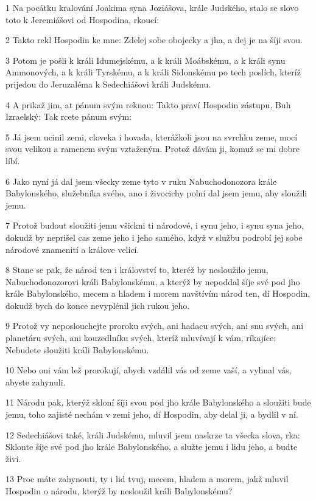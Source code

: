 \par 1 Na pocátku kralování Joakima syna Joziášova, krále Judského, stalo se slovo toto k Jeremiášovi od Hospodina, rkoucí:
\par 2 Takto rekl Hospodin ke mne: Zdelej sobe obojecky a jha, a dej je na šíji svou.
\par 3 Potom je pošli k králi Idumejskému, a k králi Moábskému, a k králi synu Ammonových, a k králi Tyrskému, a k králi Sidonskému po tech poslích, kteríž prijedou do Jeruzaléma k Sedechiášovi králi Judskému.
\par 4 A prikaž jim, at pánum svým reknou: Takto praví Hospodin zástupu, Buh Izraelský: Tak rcete pánum svým:
\par 5 Já jsem ucinil zemi, cloveka i hovada, kterážkoli jsou na svrchku zeme, mocí svou velikou a ramenem svým vztaženým. Protož dávám ji, komuž se mi dobre líbí.
\par 6 Jako nyní já dal jsem všecky zeme tyto v ruku Nabuchodonozora krále Babylonského, služebníka svého, ano i živocichy polní dal jsem jemu, aby sloužili jemu.
\par 7 Protož budout sloužiti jemu všickni ti národové, i synu jeho, i synu syna jeho, dokudž by neprišel cas zeme jeho i jeho samého, když v službu podrobí jej sobe národové znamenití a králove velicí.
\par 8 Stane se pak, že národ ten i království to, kteréž by nesloužilo jemu, Nabuchodonozorovi králi Babylonskému, a kterýž by nepoddal šíje své pod jho krále Babylonského, mecem a hladem i morem navštívím národ ten, dí Hospodin, dokudž bych do konce nevyplénil jich rukou jeho.
\par 9 Protož vy neposlouchejte proroku svých, ani hadacu svých, ani snu svých, ani planetáru svých, ani kouzedlníku svých, kteríž mluvívají k vám, ríkajíce: Nebudete sloužiti králi Babylonskému.
\par 10 Nebo oni vám lež prorokují, abych vzdálil vás od zeme vaší, a vyhnal vás, abyste zahynuli.
\par 11 Národu pak, kterýž skloní šíji svou pod jho krále Babylonského a sloužiti bude jemu, toho zajisté nechám v zemi jeho, dí Hospodin, aby delal ji, a bydlil v ní.
\par 12 Sedechiášovi také, králi Judskému, mluvil jsem naskrze ta všecka slova, rka: Sklonte šíje své pod jho krále Babylonského, a služte jemu i lidu jeho, a budte živi.
\par 13 Proc máte zahynouti, ty i lid tvuj, mecem, hladem a morem, jakž mluvil Hospodin o národu, kterýž by nesloužil králi Babylonskému?
